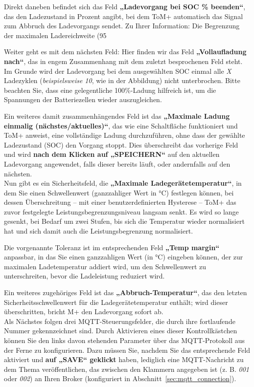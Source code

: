 Direkt daneben befindet sich das Feld \textbf{„Ladevorgang bei SOC \% beenden“}, das den Ladezustand
in Prozent angibt, bei dem ToM+ automatisch das Signal zum Abbruch des Ladevorgangs sendet.
Zu Ihrer Information: Die Begrenzung der maximalen Ladereichweite (95 %

Weiter geht es mit dem nächsten Feld: Hier finden wir das Feld \textbf{„Vollaufladung nach“}, das
in engem Zusammenhang mit dem zuletzt besprochenen Feld steht. Im Grunde wird der Ladevorgang bei
dem ausgewählten SOC einmal alle \textit{X} Ladezyklen (\textit{beispielsweise 10}, wie in der Abbildung) nicht unterbrochen.
Bitte beachten Sie, dass eine gelegentliche 100\%-Ladung hilfreich ist, um die Spannungen der Batteriezellen wieder auszugleichen.

Ein weiteres damit zusammenhängendes Feld ist das \textbf{„Maximale Ladung einmalig (nächstes/aktuelles)“}, das
wie eine Schaltfläche funktioniert und ToM+ anweist, eine vollständige Ladung durchzuführen, ohne dass der gewählte Ladezustand (SOC) den Vorgang stoppt. Dies
überschreibt das vorherige Feld und wird \textbf{nach dem Klicken auf „SPEICHERN“} auf den
aktuellen Ladevorgang angewendet, falls dieser bereits läuft, oder andernfalls auf den nächsten.\\


Nun gibt es ein Sicherheitsfeld, die \textbf{„Maximale Ladegerätetemperatur“}, in dem Sie
einen Schwellenwert (ganzzahliger Wert in °C) festlegen können, bei dessen Überschreitung – mit einer benutzerdefinierten
Hysterese – ToM+ das zuvor festgelegte Leistungsbegrenzungsniveau langsam senkt. Es wird so lange
gesenkt, bei Bedarf um zwei Stufen, bis sich die Temperatur wieder normalisiert hat und sich damit auch die Leistungsbegrenzung normalisiert.

Die vorgenannte Toleranz ist im entsprechenden Feld \textbf{„Temp margin“} anpassbar, in das
Sie einen ganzzahligen Wert (in °C) eingeben können, der zur maximalen
Ladetemperatur addiert wird, um den Schwellenwert zu unterschreiten, bevor die Ladeleistung reduziert wird.

Ein weiteres zugehöriges Feld ist das \textbf{„Abbruch-Temperatur“}, das den letzten Sicherheitsschwellenwert
für die Ladegerätetemperatur enthält; wird dieser überschritten, bricht M+ den Ladevorgang sofort ab.\\


Als Nächstes folgen drei MQTT-Steuerungsfelder, die durch ihre fortlaufende Nummer gekennzeichnet sind.
Durch Aktivieren eines dieser Kontrollkästchen können Sie den links davon stehenden Parameter
über das MQTT-Protokoll aus der Ferne zu konfigurieren. Dazu müssen Sie, nachdem Sie das entsprechende Feld aktiviert und
\textbf{auf „SAVE“ geklickt} haben, lediglich eine MQTT-Nachricht zu dem Thema veröffentlichen,
das zwischen den Klammern angegeben ist (z. B. \textit{001} oder \textit{002}) an Ihren Broker
(konfiguriert in Abschnitt~\ref{sec:mqtt_connection}).

